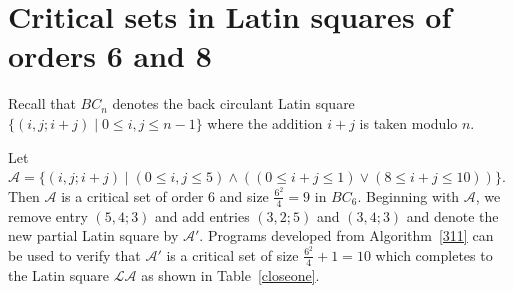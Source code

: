 \documentclass[12pt]{report}
\newtheorem{lemma}{Lemma}
\begin{document}
%
%
%
 
\section{Critical sets in Latin squares of orders 6 and 8}
Recall that $BC_n$ denotes the back circulant Latin square $\{ (i,j;i+j) 
\mid 0 \leq i,j \leq n-1 \}$ where the addition $i+j$ is taken modulo $n$.

Let $\mathcal{A} = \{ (i, j; i+j) \mid (0 \leq i,j \leq 5) \wedge ((0 \leq i + j \leq 1) \vee 
(8 \leq i + j \leq 10)) \}.$
Then $\mathcal{A}$ is a critical set of order 6 and size $\displaystyle{\frac{6^{2}}{4}} = 9$ in $BC_{6}$.
Beginning with $\mathcal{A}$, we remove entry $(5,4;3)$ and add entries $(3,2;5)$ and 
$(3,4;3)$ and denote the new partial Latin square by $\mathcal{A'}$.
Programs developed from Algorithm~\ref{311} can be used to verify that $\mathcal{A'}$
is a critical set of size $\displaystyle{\frac{6^{2}}{4}} + 1 = 10$ which
completes to the Latin square $\mathcal{LA}$ as shown in Table~\ref{closeone}.
\end{document}
